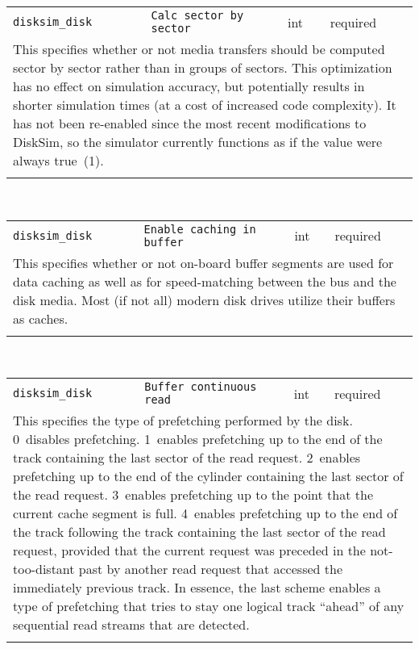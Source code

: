 \noindent 
\begin{tabular}{|p{\lpmodwidth}|p{\lpnamewidth}|p{0.5in}|p{0.5in}|}
\cline{1-4}
\texttt{disksim\_disk} & \texttt{Calc sector by sector} & int & required \\ 
\cline{1-4}
\multicolumn{4}{|p{6in}|}{
This specifies whether or not media transfers should be computed sector by
sector rather than in groups of sectors. This optimization has no
effect on simulation accuracy, but potentially results in shorter
simulation times (at a cost of increased code complexity). It has not
been re-enabled since the most recent modifications to DiskSim, so the
simulator currently functions as if the value were always true~(1).
}\\ 
\cline{1-4}
\multicolumn{4}{p{5in}}{}\\
\end{tabular}\\ 
\noindent 
\begin{tabular}{|p{\lpmodwidth}|p{\lpnamewidth}|p{0.5in}|p{0.5in}|}
\cline{1-4}
\texttt{disksim\_disk} & \texttt{Enable caching in buffer} & int & required \\ 
\cline{1-4}
\multicolumn{4}{|p{6in}|}{
This specifies whether or not
on-board buffer segments are used for data caching as well as for
speed-matching between the bus and the disk media. Most (if not all) modern
disk drives utilize their buffers as caches.
}\\ 
\cline{1-4}
\multicolumn{4}{p{5in}}{}\\
\end{tabular}\\ 
\noindent 
\begin{tabular}{|p{\lpmodwidth}|p{\lpnamewidth}|p{0.5in}|p{0.5in}|}
\cline{1-4}
\texttt{disksim\_disk} & \texttt{Buffer continuous read} & int & required \\ 
\cline{1-4}
\multicolumn{4}{|p{6in}|}{
This specifies the type of prefetching performed by the disk. 0~disables
prefetching. 1~enables prefetching up to the end of the track
containing the last sector of the read request. 2~enables prefetching
up to the end of the cylinder containing the last sector of the read
request. 3~enables prefetching up to the point that the current cache
segment is full. 4~enables prefetching up to the end of the track
following the track containing the last sector of the read request,
provided that the current request was preceded in the not-too-distant
past by another read request that accessed the immediately previous
track. In essence, the last scheme enables a type of prefetching that
tries to stay one logical track ``ahead'' of any sequential read
streams that are detected.
}\\ 
\cline{1-4}
\multicolumn{4}{p{5in}}{}\\
\end{tabular}\\ 
